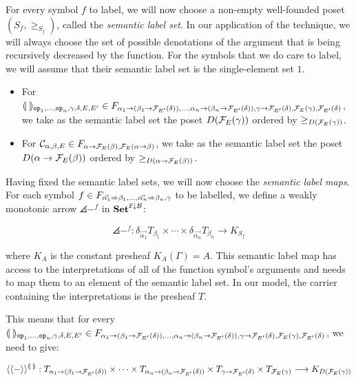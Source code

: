 For every symbol $f$ to label, we will now choose a non-empty well-founded
poset $(S_f, \ge_{S_f})$, called the \emph{semantic label set}. In our
application of the technique, we will always choose the set of possible
denotations of the argument that is being recursively decreased by the
function. For the symbols that we do care to label, we will assume that
their semantic label set is the single-element set $1$.

\begin{itemize}
\item For
  $\llparenthesis \,  \, \rrparenthesis_{\mathtt{op}_1, \ldots, \mathtt{op}_n, \gamma, \delta, E, E'} \in
  F_{\alpha_1 \to (\beta_1 \to \mathcal{F}_{E'}(\delta)), \ldots, \alpha_n \to
    (\beta_n \to \mathcal{F}_{E'}(\delta)), \gamma \to \mathcal{F}_{E'}(\delta),
    \mathcal{F}_E(\gamma), \mathcal{F}_{E'}(\delta)}$, we take as the semantic label set
  the poset $D(\mathcal{F}_E(\gamma))$ ordered by $\ge_{D(\mathcal{F}_E(\gamma))}$.
\item For
  $\mathcal{C}_{\alpha,\beta,E} \in F_{\alpha \to \mathcal{F}_E(\beta),\mathcal{F}_E(\alpha \to
    \beta)}$, we take as the semantic label set the poset
  $D(\alpha \to \mathcal{F}_E(\beta))$ ordered by
  $\ge_{D(\alpha \to \mathcal{F}_E(\beta))}$.
\end{itemize}

Having fixed the semantic label sets, we will now choose the \emph{semantic
  label maps}. For each symbol
$f \in F_{\vec{\alpha_1} \Rightarrow \beta_1, \ldots, \vec{\alpha_n} \Rightarrow \beta_n,
  \gamma}$ to be labelled, we define a weakly monotonic arrow
$\angles{-}^f$ in $\mathbf{Set}^{\mathbb{F}\downarrow\mathcal{B}}$:

$$
\angles{-}^f : \delta_{\vec{\alpha_1}} T_{\beta_1} \times \cdots \times
\delta_{\vec{\alpha_n}} T_{\beta_n} \longrightarrow K_{S_f}
$$

where $K_A$ is the constant presheaf $K_A(\Gamma) = A$. This semantic label
map has access to the interpretations of all of the function symbol's
arguments and needs to map them to an element of the semantic label set. In
our model, the carrier containing the interpretations is the presheaf $T$.

This means that for every
$\llparenthesis \,  \, \rrparenthesis_{\mathtt{op}_1, \ldots, \mathtt{op}_n, \gamma, \delta, E, E'} \in
F_{\alpha_1 \to (\beta_1 \to \mathcal{F}_{E'}(\delta)), \ldots, \alpha_n \to
  (\beta_n \to \mathcal{F}_{E'}(\delta)), \gamma \to \mathcal{F}_{E'}(\delta),
  \mathcal{F}_E(\gamma), \mathcal{F}_{E'}(\delta)}$, we need to give:

$$
\langle\langle-\rangle\rangle^{\llparenthesis \,  \, \rrparenthesis} : T_{\alpha_1 \to (\beta_1 \to
  \mathcal{F}_{E'}(\delta))} \times \cdots \times T_{\alpha_n \to (\beta_n \to
  \mathcal{F}_{E'}(\delta))} \times T_{\gamma \to \mathcal{F}_{E'}(\delta)} \times
T_{\mathcal{F}_E(\gamma)} \longrightarrow K_{D(\mathcal{F}_E(\gamma))}
$$

